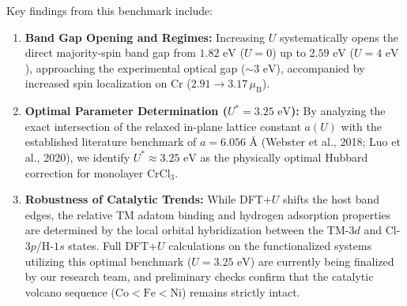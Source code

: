 \documentclass[11pt, sans, a4paper]{moderncv}
\begin{document}
\begin{center}
\small
{}
\end{center}

Key findings from this benchmark include:
\begin{enumerate}[leftmargin=1.5em, itemsep=0.2em]
\item \textbf{Band Gap Opening and Regimes:} Increasing $U$ systematically opens the direct majority-spin band gap from $1.82\text{ eV}$ ($U=0$) up to $2.59\text{ eV}$ ($U=4\text{ eV}$), approaching the experimental optical gap ($\sim 3\text{ eV}$), accompanied by increased spin localization on Cr ($2.91 \to 3.17\,\mu_{\mathrm{B}}$).
\item \textbf{Optimal Parameter Determination ($U^* = 3.25\text{ eV}$):} By analyzing the exact intersection of the relaxed in-plane lattice constant $a(U)$ with the established literature benchmark of $a = 6.056\text{ \AA}$ (Webster et al., 2018; Luo et al., 2020), we identify $U^* \approx 3.25\text{ eV}$ as the physically optimal Hubbard correction for monolayer $\text{CrCl}_3$.
\item \textbf{Robustness of Catalytic Trends:} While DFT+$U$ shifts the host band edges, the relative TM adatom binding and hydrogen adsorption properties are determined by the local orbital hybridization between the TM-$3d$ and Cl-$3p$/H-$1s$ states. Full DFT+$U$ calculations on the functionalized systems utilizing this optimal benchmark ($U = 3.25\text{ eV}$) are currently being finalized by our research team, and preliminary checks confirm that the catalytic volcano sequence ($\text{Co} < \text{Fe} < \text{Ni}$) remains strictly intact.
\end{enumerate}
\end{document}
